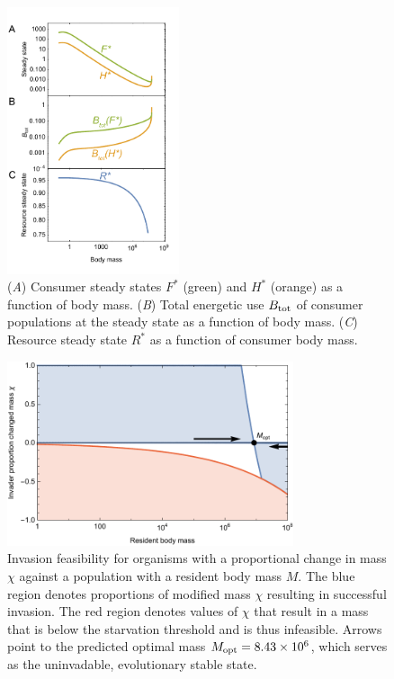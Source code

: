 \documentclass{pnastwo}
\begin{document}
\begin{figure}
\centering
\includegraphics[width=0.45\textwidth]{fig_FPAllometric.pdf}
\caption{ (\emph{A}) Consumer steady states $F^*$ (green) and $H^*$ (orange) as a function of
  body mass. 
  (\emph{B}) Total energetic use $B_{\rm tot}$ of consumer populations at the steady state as a function of body mass.
  (\emph{C}) Resource steady state $R^*$ as a function of consumer body mass.}
\label{fig:mass}
\end{figure}  
 
\begin{figure}
\centering
\includegraphics[width=0.75\textwidth]{fig_Invasion.pdf}
\caption{ Invasion feasibility for organisms with a proportional change in
  mass $\chi$ against a population with a resident body mass $M$.  The blue
  region denotes proportions of modified mass $\chi$ resulting in successful invasion.  The
  red region denotes values of $\chi$ that result in a mass that is below the
  starvation threshold and is thus infeasible.
  Arrows point to the predicted optimal mass $M_{\rm opt}=8.43\times 10^6$, which serves as the uninvadable, evolutionary stable state.}
\label{fig:invasion}
\end{figure}  
 
\end{document}
